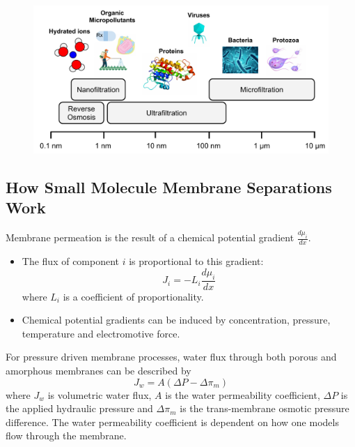   \begin{figure}
  \centering
  \includegraphics[width=\textwidth]{figs/membrane_separation_size_regimes.pdf}
  \caption{}\label{fig:size_regimes}
  \end{figure}
  
  \subsection{How Small Molecule Membrane Separations Work}
  
  Membrane permeation is the result of a chemical potential gradient $\frac{d\mu_i}{dx}$.
  \begin{itemize}
	  \item The flux of component $i$ is proportional to this gradient:
	  \begin{equation}
	    J_i = -L_i \frac{d\mu_i}{dx}
	  \end{equation}
	  where $L_i$ is a coefficient of proportionality.
	  \item Chemical potential gradients can be induced by concentration, pressure, 
	  temperature and electromotive force.
  \end{itemize}
  
  For pressure driven membrane processes, water flux through both porous and 
  amorphous membranes can be described by
  \begin{equation}
  J_w = A(\Delta P - \Delta \pi_m)
  \end{equation}
  where $J_w$ is volumetric water flux, $A$ is the water permeability coefficient,
  $\Delta P$ is the applied hydraulic pressure and $\Delta \pi_m$ is the 
  trans-membrane osmotic pressure difference. The water permeability coefficient
  is dependent on how one models flow through the membrane.
  
